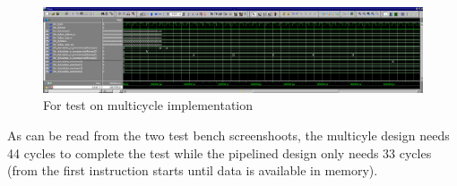 \begin{figure}[h]
        \centerline{\includegraphics[width=590px]{figures/tb/multicycle_for_test}}
        \caption{For test on multicycle implementation}
        \label{fig:multi_cycle_for_tb}
\end{figure}

As can be read from the two test bench screenshoots, the multicyle
design needs 44 cycles to complete the test while the pipelined design only needs
33 cycles (from the first instruction starts until data is available in memory). 
\FloatBarrier